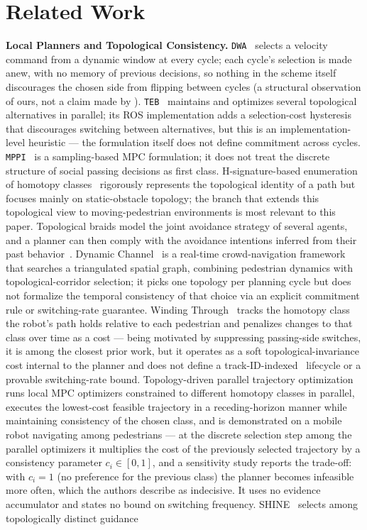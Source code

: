 \section{Related Work}\label{sec:related}

\noindent\textbf{Local Planners and Topological Consistency.} \texttt{DWA}~\citep{fox1997dwa} selects a velocity command from a dynamic window at every cycle; each cycle's selection is made anew, with no memory of previous decisions, so nothing in the scheme itself discourages the chosen side from flipping between cycles (a structural observation of ours, not a claim made by \citet{fox1997dwa}). \texttt{TEB}~\citep{rosmann2017teb} maintains and optimizes several topological alternatives in parallel; its ROS implementation adds a selection-cost hysteresis that discourages switching between alternatives, but this is an implementation-level heuristic --- the formulation itself does not define commitment across cycles. \texttt{MPPI}~\citep{williams2017mppi} is a sampling-based MPC formulation; it does not treat the discrete structure of social passing decisions as first class. H-signature-based enumeration of homotopy classes~\citep{bhattacharya2012topological} rigorously represents the topological identity of a path but focuses mainly on static-obstacle topology; the branch that extends this topological view to moving-pedestrian environments is most relevant to this paper. Topological braids model the joint avoidance strategy of several agents, and a planner can then comply with the avoidance intentions inferred from their past behavior~\citep{mavrogiannis2019braids}. Dynamic Channel~\citep{cao2019dynamicchannel} is a real-time crowd-navigation framework that searches a triangulated spatial graph, combining pedestrian dynamics with topological-corridor selection; it picks one topology per planning cycle but does not formalize the temporal consistency of that choice via an explicit commitment rule or switching-rate guarantee. Winding Through~\citep{mavrogiannis2023winding} tracks the homotopy class the robot's path holds relative to each pedestrian and penalizes changes to that class over time as a cost --- being motivated by suppressing passing-side switches, it is among the closest prior work, but it operates as a soft topological-invariance cost internal to the planner and does not define a track-ID-indexed \Class\ lifecycle or a provable switching-rate bound. Topology-driven parallel trajectory optimization~\citep{degroot2024topology} runs local MPC optimizers constrained to different homotopy classes in parallel, executes the lowest-cost feasible trajectory in a receding-horizon manner while maintaining consistency of the chosen class, and is demonstrated on a mobile robot navigating among pedestrians --- at the discrete selection step among the parallel optimizers it multiplies the cost of the previously selected trajectory by a consistency parameter $c_i \in [0,1]$, and a sensitivity study reports the trade-off: with $c_i = 1$ (no preference for the previous class) the planner becomes infeasible more often, which the authors describe as indecisive. It uses no evidence accumulator and states no bound on switching frequency. SHINE~\citep{martinezbaselga2026shine} selects among topologically distinct guidance 